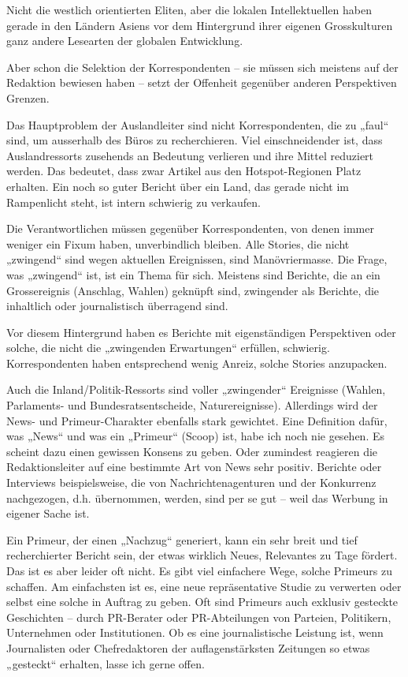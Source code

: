 Nicht die westlich orientierten Eliten, aber die lokalen Intellektuellen
haben gerade in den Ländern Asiens vor dem Hintergrund ihrer eigenen
Grosskulturen ganz andere Lesearten der globalen Entwicklung.

Aber schon die Selektion der Korrespondenten -- sie müssen sich meistens
auf der Redaktion bewiesen haben -- setzt der Offenheit gegenüber
anderen Perspektiven Grenzen.

Das Hauptproblem der Auslandleiter sind nicht Korrespondenten, die zu
„faul`` sind, um ausserhalb des Büros zu recherchieren. Viel
einschneidender ist, dass Auslandressorts zusehends an Bedeutung
verlieren und ihre Mittel reduziert werden. Das bedeutet, dass zwar
Artikel aus den Hotspot-Regionen Platz erhalten. Ein noch so guter
Bericht über ein Land, das gerade nicht im Rampenlicht steht, ist intern
schwierig zu verkaufen.

Die Verantwortlichen müssen gegenüber Korrespondenten, von denen immer
weniger ein Fixum haben, unverbindlich bleiben. Alle Stories, die nicht
„zwingend`` sind wegen aktuellen Ereignissen, sind Manövriermasse. Die
Frage, was „zwingend`` ist, ist ein Thema für sich. Meistens sind
Berichte, die an ein Grossereignis (Anschlag, Wahlen) geknüpft sind,
zwingender als Berichte, die inhaltlich oder journalistisch überragend
sind.

Vor diesem Hintergrund haben es Berichte mit eigenständigen Perspektiven
oder solche, die nicht die „zwingenden Erwartungen`` erfüllen,
schwierig. Korrespondenten haben entsprechend wenig Anreiz, solche
Stories anzupacken.

Auch die Inland/Politik-Ressorts sind voller „zwingender`` Ereignisse
(Wahlen, Parlaments- und Bundesratsentscheide, Naturereignisse).
Allerdings wird der News- und Primeur-Charakter ebenfalls stark
gewichtet. Eine Definition dafür, was „News`` und was ein „Primeur``
(Scoop) ist, habe ich noch nie gesehen. Es scheint dazu einen gewissen
Konsens zu geben. Oder zumindest reagieren die Redaktionsleiter auf eine
bestimmte Art von News sehr positiv. Berichte oder Interviews
beispielsweise, die von Nachrichtenagenturen und der Konkurrenz
nachgezogen, d.h. übernommen, werden, sind per se gut -- weil das
Werbung in eigener Sache ist.

Ein Primeur, der einen „Nachzug`` generiert, kann ein sehr breit und
tief recherchierter Bericht sein, der etwas wirklich Neues, Relevantes
zu Tage fördert. Das ist es aber leider oft nicht. Es gibt viel
einfachere Wege, solche Primeurs zu schaffen. Am einfachsten ist es,
eine neue repräsentative Studie zu verwerten oder selbst eine solche in
Auftrag zu geben. Oft sind Primeurs auch exklusiv gesteckte Geschichten
-- durch PR-Berater oder PR-Abteilungen von Parteien, Politikern,
Unternehmen oder Institutionen. Ob es eine journalistische Leistung ist,
wenn Journalisten oder Chefredaktoren der auflagenstärksten Zeitungen so
etwas „gesteckt`` erhalten, lasse ich gerne offen.


